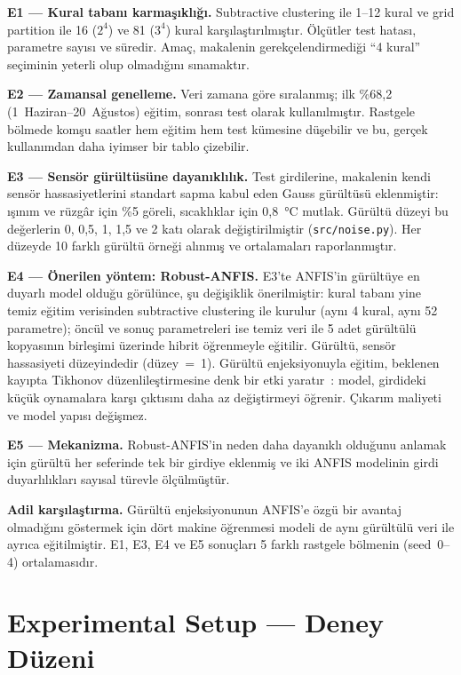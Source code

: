 \documentclass[11pt,a4paper]{article}
\begin{document}
\textbf{E1 — Kural tabanı karmaşıklığı.} Subtractive clustering ile 1–12 kural ve grid partition ile 16 ($2^4$) ve 81 ($3^4$) kural karşılaştırılmıştır. Ölçütler test hatası, parametre sayısı ve süredir. Amaç, makalenin gerekçelendirmediği “4 kural” seçiminin yeterli olup olmadığını sınamaktır.

\textbf{E2 — Zamansal genelleme.} Veri zamana göre sıralanmış; ilk \%68,2 (1~Haziran–20~Ağustos) eğitim, sonrası test olarak kullanılmıştır. Rastgele bölmede komşu saatler hem eğitim hem test kümesine düşebilir ve bu, gerçek kullanımdan daha iyimser bir tablo çizebilir.

\textbf{E3 — Sensör gürültüsüne dayanıklılık.} Test girdilerine, makalenin kendi sensör hassasiyetlerini standart sapma kabul eden Gauss gürültüsü eklenmiştir: ışınım ve rüzgâr için \%5 göreli, sıcaklıklar için 0,8~°C mutlak. Gürültü düzeyi bu değerlerin 0, 0,5, 1, 1,5 ve 2 katı olarak değiştirilmiştir (\texttt{src/noise.py}). Her düzeyde 10 farklı gürültü örneği alınmış ve ortalamaları raporlanmıştır.

\textbf{E4 — Önerilen yöntem: Robust-ANFIS.} E3'te ANFIS'in gürültüye en duyarlı model olduğu görülünce, şu değişiklik önerilmiştir: kural tabanı yine temiz eğitim verisinden subtractive clustering ile kurulur (aynı 4 kural, aynı 52 parametre); öncül ve sonuç parametreleri ise temiz veri ile 5 adet gürültülü kopyasının birleşimi üzerinde hibrit öğrenmeyle eğitilir. Gürültü, sensör hassasiyeti düzeyindedir (düzey~=~1). Gürültü enjeksiyonuyla eğitim, beklenen kayıpta Tikhonov düzenlileştirmesine denk bir etki yaratır~\cite{bishop1995}: model, girdideki küçük oynamalara karşı çıktısını daha az değiştirmeyi öğrenir. Çıkarım maliyeti ve model yapısı değişmez.

\textbf{E5 — Mekanizma.} Robust-ANFIS'in neden daha dayanıklı olduğunu anlamak için gürültü her seferinde tek bir girdiye eklenmiş ve iki ANFIS modelinin girdi duyarlılıkları sayısal türevle ölçülmüştür.

\textbf{Adil karşılaştırma.} Gürültü enjeksiyonunun ANFIS'e özgü bir avantaj olmadığını göstermek için dört makine öğrenmesi modeli de aynı gürültülü veri ile ayrıca eğitilmiştir. E1, E3, E4 ve E5 sonuçları 5 farklı rastgele bölmenin (seed~0–4) ortalamasıdır.

\section{Experimental Setup — Deney Düzeni}
\end{document}
